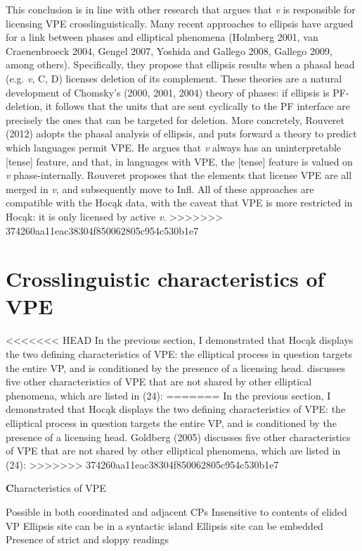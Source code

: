 \documentclass[output=paper]{LSP/langsci}
\begin{document}
This conclusion is in line with other research that argues that \emph{v} is responsible for licensing VPE crosslinguistically. Many recent approaches to ellipsis have argued for a link between phases and elliptical phenomena (Holmberg 2001, van Craenenbroeck 2004, Gengel 2007, Yoshida and Gallego 2008, Gallego 2009, among others). Specifically, they propose that ellipsis results when a phasal head (e.g. \emph{v}, C, D) licenses deletion of its complement. These theories are a natural development of Chomsky's (2000, 2001, 2004) theory of phases: if ellipsis is PF-deletion, it follows that the units that are sent cyclically to the PF interface are precisely the ones that can be targeted for deletion. More concretely, Rouveret (2012) adopts the phasal analysis of ellipsis, and puts forward a theory to predict which languages permit VPE. He argues that \emph{v} always has an uninterpretable [tense] feature, and that, in languages with VPE, the [tense] feature is valued on \emph{v} phase-internally. Rouveret proposes that the elements that license VPE are all merged in \emph{v}, and subsequently move to Infl. All of these approaches are compatible with the Hoc\k{a}k data, with the caveat that VPE is more restricted in Hoc\k{a}k: it is only licensed by active \emph{v}.
>>>>>>> 374260aa11eac38304f850062805c954c530b1e7


\section{Crosslinguistic characteristics of VPE}

<<<<<<< HEAD
In the previous section, I demonstrated that Hocąk displays the two defining characteristics of VPE: the elliptical process in question targets the entire VP, and is conditioned by the presence of a licensing head. \citet{Goldberg2005} discusses five other characteristics of VPE that are not shared by other elliptical phenomena, which are listed in (24): 
=======
In the previous section, I demonstrated that Hoc\k{a}k displays the two defining characteristics of VPE: the elliptical process in question targets the entire VP, and is conditioned by the presence of a licensing head. Goldberg (2005) discusses five other characteristics of VPE that are not shared by other elliptical phenomena, which are listed in (24): 
>>>>>>> 374260aa11eac38304f850062805c954c530b1e7

\begin{exe}
\ex
{\textbf Characteristics of VPE}
\begin{xlist}
\ex
Possible in both coordinated and adjacent CPs
\ex
Insensitive to contents of elided VP
\ex
Ellipsis site can be in a syntactic island
\ex
Ellipsis site can be embedded
\ex
Presence of strict and sloppy readings
\end{xlist}
\end{exe}
\end{document}
